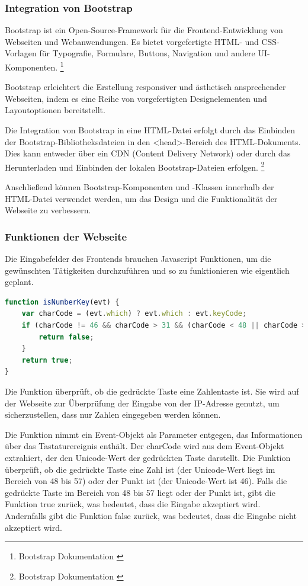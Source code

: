 \subsubsection*{Integration von Bootstrap}
Bootstrap ist ein Open-Source-Framework für die Frontend-Entwicklung von Webseiten und Webanwendungen. Es bietet
vorgefertigte HTML- und CSS-Vorlagen für Typografie, Formulare, Buttons, Navigation und andere UI-Komponenten. \footnote{Bootstrap Dokumentation \cite{Bootstrap}}

Bootstrap erleichtert die Erstellung responsiver und ästhetisch ansprechender Webseiten, indem es eine Reihe von
vorgefertigten Designelementen und Layoutoptionen bereitstellt.

Die Integration von Bootstrap in eine HTML-Datei erfolgt durch das Einbinden der Bootstrap-Bibliotheksdateien in den
<head>-Bereich des HTML-Dokuments. Dies kann entweder über ein CDN (Content Delivery Network) oder durch das Herunterladen
und Einbinden der lokalen Bootstrap-Dateien erfolgen. \footnote{Bootstrap Dokumentation \cite{CDN-Links}}

Anschließend können Bootstrap-Komponenten und -Klassen innerhalb der HTML-Datei verwendet werden, um das Design und
die Funktionalität der Webseite zu verbessern.

\subsubsection{Funktionen der Webseite}
Die Eingabefelder des Frontends brauchen Javascript Funktionen, um die gewünschten Tätigkeiten durchzuführen und so zu
funktionieren wie eigentlich geplant.

\begin{lstlisting}[language=JavaScript, caption={Javascript | Überprüfung, ob die Eingabe eine Zahl oder "." ist}]
function isNumberKey(evt) {
    var charCode = (evt.which) ? evt.which : evt.keyCode;
    if (charCode != 46 && charCode > 31 && (charCode < 48 || charCode > 57)) {
        return false;
    }
    return true;
}
\end{lstlisting}

Die Funktion überprüft, ob die gedrückte Taste eine Zahlentaste ist. Sie wird auf der Webseite zur Überprüfung der Eingabe
von der IP-Adresse genutzt, um sicherzustellen, dass nur Zahlen eingegeben werden können.

Die Funktion nimmt ein Event-Objekt als Parameter entgegen, das Informationen über das Tastaturereignis enthält. Der
charCode wird aus dem Event-Objekt extrahiert, der den Unicode-Wert der gedrückten Taste darstellt. Die Funktion überprüft,
ob die gedrückte Taste eine Zahl ist (der Unicode-Wert liegt im Bereich von 48 bis 57) oder der Punkt ist (der Unicode-Wert
ist 46). Falls die gedrückte Taste im Bereich von 48 bis 57 liegt oder der Punkt ist, gibt die Funktion true zurück, was
bedeutet, dass die Eingabe akzeptiert wird. Andernfalls gibt die Funktion false zurück, was bedeutet, dass die Eingabe
nicht akzeptiert wird.

